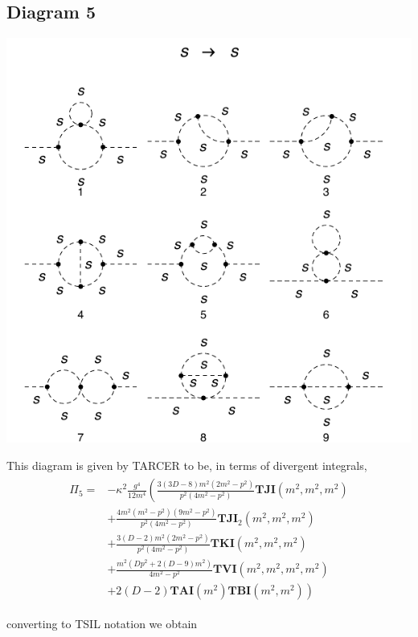 \documentclass[11pt]{article}
\newcommand{\tsil}{\textsf{TSIL} }
\newcommand{\tarcer}{\textsf{TARCER} }
\begin{document}
\subsection*{Diagram 5}
\noindent\begin{minipage}{0.3\textwidth}
\begin{center}
\includegraphics{2loop_5.pdf}
\end{center}
\end{minipage}
\noindent\begin{minipage}{0.7\textwidth}
This diagram is given by \tarcer to be, in terms of divergent integrals,
\begin{align}
\begin{split}
\Pi_5 =&- \kappa^2 \frac{g^4}{12 m^4} \left( \frac{3(3D-8)m^2(2m^2-p^2)}{p^2(4m^2-p^2)}\mathbf{TJI}(m^2,m^2,m^2)\right. \\
&+ \frac{4m^2(m^2-p^2)(9m^2-p^2)}{p^2(4m^2-p^2)}\mathbf{TJI}_2(m^2,m^2,m^2)\\
&+\frac{3(D-2)m^2(2m^2-p^2)}{p^2(4m^2-p^2)}\mathbf{TKI}(m^2,m^2,m^2)\\
&+\frac{m^2(D p^2+2(D-9)m^2)}{4m^2-p^2}\mathbf{TVI}(m^2,m^2,m^2,m^2)\\
&\left.+2(D-2)\mathbf{TAI}(m^2) \mathbf{TBI}(m^2,m^2) \right)
\end{split}
\end{align}
\end{minipage}
converting to \tsil notation we obtain
\end{document}
